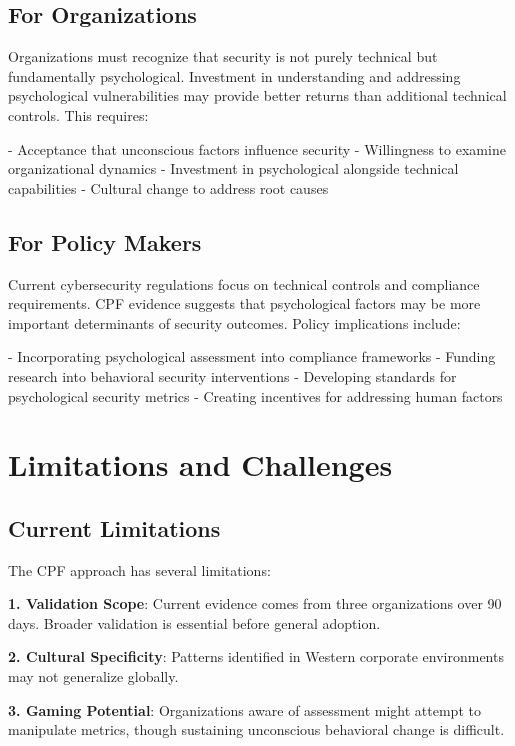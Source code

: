 \documentclass[11pt,a4paper]{article}
\begin{document}
\subsection{For Organizations}

Organizations must recognize that security is not purely technical but fundamentally psychological. Investment in understanding and addressing psychological vulnerabilities may provide better returns than additional technical controls. This requires:

- Acceptance that unconscious factors influence security
- Willingness to examine organizational dynamics
- Investment in psychological alongside technical capabilities
- Cultural change to address root causes

\subsection{For Policy Makers}

Current cybersecurity regulations focus on technical controls and compliance requirements. CPF evidence suggests that psychological factors may be more important determinants of security outcomes. Policy implications include:

- Incorporating psychological assessment into compliance frameworks
- Funding research into behavioral security interventions
- Developing standards for psychological security metrics
- Creating incentives for addressing human factors

\section{Limitations and Challenges}

\subsection{Current Limitations}

The CPF approach has several limitations:

\textbf{1. Validation Scope}: Current evidence comes from three organizations over 90 days. Broader validation is essential before general adoption.

\textbf{2. Cultural Specificity}: Patterns identified in Western corporate environments may not generalize globally.

\textbf{3. Gaming Potential}: Organizations aware of assessment might attempt to manipulate metrics, though sustaining unconscious behavioral change is difficult.
\end{document}

